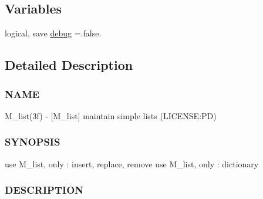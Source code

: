 \subsection*{Variables}
\begin{DoxyCompactItemize}
\item 
logical, save \mbox{\hyperlink{namespacem__list_aaa3ea916cd8c669ebbc8ec9096c5bbca}{debug}} =.false.
\end{DoxyCompactItemize}


\subsection{Detailed Description}
\subsubsection*{N\+A\+ME}

M\+\_\+list(3f) -\/ \mbox{[}M\+\_\+list\mbox{]} maintain simple lists (L\+I\+C\+E\+N\+SE\+:PD) 

\subsubsection*{S\+Y\+N\+O\+P\+S\+IS}

\begin{DoxyVerb}use M_list, only : insert, replace, remove
use M_list, only : dictionary
\end{DoxyVerb}


\subsubsection*{D\+E\+S\+C\+R\+I\+P\+T\+I\+ON}

